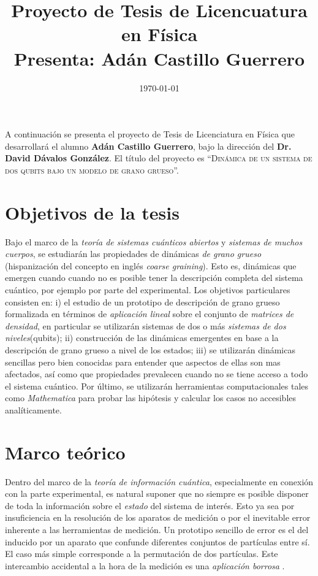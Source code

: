 \documentclass[onecolumn,11pt]{article}
\title{Proyecto de Tesis de Licencuatura en Física\\ Presenta: Adán Castillo Guerrero}
\date{\today}
\begin{document}
\maketitle
\thispagestyle{empty}
A continuación se presenta el proyecto de Tesis de Licenciatura en Física que desarrollará el alumno \textbf{Adán Castillo Guerrero}, bajo la dirección del \textbf{Dr. David Dávalos González}. El título del proyecto es ``\textsc{Dinámica de un sistema de dos qubits bajo un modelo de grano grueso}''.

\section{Objetivos de la tesis}
Bajo el marco de la \textit{teoría de sistemas cuánticos abiertos} y \textit{sistemas de muchos cuerpos}, se estudiarán las propiedades de dinámicas \textit{de grano grueso} (hispanización del concepto en inglés \textit{coarse graining}). Esto es, dinámicas que emergen cuando cuando no es posible tener la descripción completa del sistema cuántico, por ejemplo por parte del experimental. Los objetivos particulares consisten en: i) el estudio de un prototipo de descripción de grano grueso formalizada en términos de \textit{aplicación lineal} sobre el conjunto de \textit{matrices de densidad}, en particular se utilizarán sistemas de dos o más \textit{sistemas de dos niveles}(qubits); ii) construcción de las dinámicas emergentes en base a la descripción de grano grueso a nivel de los estados; iii) se utilizarán dinámicas sencillas pero bien conocidas para entender que aspectos de ellas son mas afectados, así como que propiedades prevalecen cuando no se tiene acceso a todo el sistema cuántico. Por último, se utilizarán herramientas computacionales tales como \textit{Mathematica} para probar las hipótesis y calcular los casos no accesibles analíticamente.

\section{Marco teórico}


Dentro del marco de la \textit{teoría de información cuántica}, especialmente en conexión con la parte experimental, es natural suponer que no siempre es posible disponer de toda la información sobre el \textit{estado} del sistema de interés. Esto ya sea por insuficiencia en la resolución de los aparatos de medición o por el inevitable error inherente a las herramientas de medición. Un prototipo sencillo de error es el del inducido por un aparato que confunde diferentes conjuntos de partículas entre sí. El caso más simple corresponde a la permutación de dos partículas. Este intercambio accidental a la hora de la medición es una \textit{aplicación borrosa} \cite{FuzzyMeasurements}.
\end{document}
